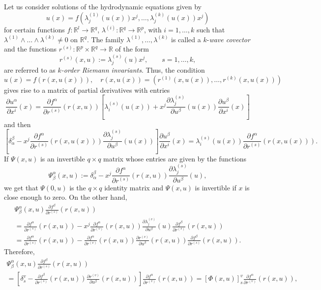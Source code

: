 \documentclass{birkjour}
\theoremstyle{definition}
\theoremstyle{remark}
\numberwithin{equation}{section}
\numberwithin{equation}{section}
\numberwithin{thm}{section}
\numberwithin{equation}{section}
\numberwithin{thm}{section}
\begin{document}
Let us consider solutions of the hydrodynamic equations given by
$$
u(x)=f\left(\lambda^{(1)}_j(u(x))x^j,\ldots,\lambda^{(k)}_j(u(x))x^j\right)
$$
for certain functions $f:\mathbb{R}^l\rightarrow \mathbb{R}^q$, $\lambda^{(i)}:\mathbb{R}^q\rightarrow \mathbb{R}^p$, with $i=1,\ldots,k$ such that  $\lambda^{(1)}\wedge\ldots\wedge \lambda^{(k)}\neq0$ on $\mathbb{R}^q$. 
The family $\lambda^{(1)},\ldots,\lambda^{(k)}$ is called a $k$-{\it wave covector} and  the functions $r^{(s)}:\mathbb{R}^p\times\mathbb{R}^q\rightarrow \mathbb{R}$ of the form
$$
r^{(s)}(x,u):=\lambda^{(s)}_j(u)x^j,\qquad s=1,\ldots,k,
$$
are referred to as {\it $k$-order Riemann invariants}. 
Thus, the condition
$$u(x)
=f(r(x,u(x))),\quad r(x,u(x))=( r^{(1)}(x,u(x)),\ldots,r^{(k)}(x,u(x)))$$
gives rise to a matrix of partial derivatives with entries
\begin{equation}\label{Eq:MatrixPartialDeri}
	\frac{\partial u^\alpha}{\partial x^i}(x)=\frac{\partial f^\alpha}{\partial r^{(s)}}(r(x,u))\left[\lambda_i^{(s)}(u(x))+x^j\frac{\partial \lambda_j^{(s)}}{\partial u^\beta}(u(x))\frac{\partial u^\beta}{\partial x^i}(x)\right]
\end{equation}
and then
{\small $$
	\left[\delta_\alpha^\beta-x^j\frac{\partial f^\alpha}{\partial r^{(s)}}(r(x,u(x)))\frac{\partial \lambda_j^{(s)}}{\partial u^\beta}(u(x))\right]\frac{\partial u^\beta}{\partial x^i}(x)=\lambda_i^{(s)}(u(x))\frac{\partial f^\alpha}{\partial r^{(s)}}(r(x,u(x))).
	$$}
If $\Psi(x,u)$ is an invertible $q\times q$ matrix whose entries are given by the functions
$$
\Psi^\alpha_\beta(x,u):=\delta_\alpha^\beta-x^j\frac{\partial f^\alpha}{\partial r^{(s)}}(r(x,u))\frac{\partial \lambda_j^{(s)}}{\partial u^\beta}(u),
$$
we get that $\Psi(0,u)$ is the $q\times q$ identity matrix and $\Psi(x,u)$ is invertible if $x$ is close enough to zero. On the other hand,
\begin{multline*}
	\Psi^\alpha_\beta(x,u)\frac{\partial f^\beta}{\partial r^{(s)}}(r(x,u))\\
	=\frac{\partial f^\alpha}{\partial r^{(s)}}(r(x,u))-x^j\frac{\partial f^\alpha}{\partial r^{(v)}}(r(x,u))\frac{\partial \lambda_j^{(v)}}{\partial u^\beta}(u)\frac{\partial f^\beta}{\partial r^{(s)}}(r(x,u))\\=\frac{\partial f^\alpha}{\partial r^{(s)}}(r(x,u))-\frac{\partial f^\alpha}{\partial r^{(v)}}(r(x,u))\frac{\partial r^{(v)}}{\partial u^\beta}(r(x,u))\frac{\partial f^\beta}{\partial r^{(s)}}(r(x,u)).
\end{multline*}
Therefore,
\begin{multline*}
	\Psi^\alpha_\beta(x,u)\frac{\partial f^\beta}{\partial r^{(s)}}(r(x,u))\\=\left[\delta_s^v-\frac{\partial f^\beta}{\partial r^{(s)}}(r(x,u))\frac{\partial r^{(v)}}{\partial u^\beta}(r(x,u))\right]\frac{\partial f^\alpha}{\partial r^{(v)}}(r(x,u))=[\Phi(x,u)]^v_s\frac{\partial f^\alpha}{\partial r^{(v)}}(r(x,u)),
\end{multline*}
\end{document}

